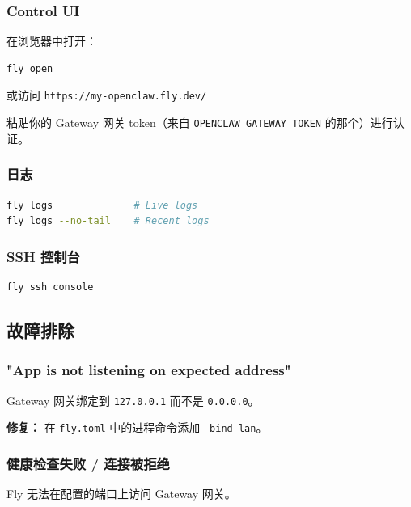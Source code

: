\subsubsection{Control UI}


在浏览器中打开：

\begin{lstlisting}[language=bash]
fly open
\end{lstlisting}


或访问 \texttt{https://my-openclaw.fly.dev/}

粘贴你的 Gateway 网关 token（来自 \texttt{OPENCLAW\_GATEWAY\_TOKEN} 的那个）进行认证。

\subsubsection{日志}


\begin{lstlisting}[language=bash]
fly logs              # Live logs
fly logs --no-tail    # Recent logs
\end{lstlisting}


\subsubsection{SSH 控制台}


\begin{lstlisting}[language=bash]
fly ssh console
\end{lstlisting}


\subsection{故障排除}


\subsubsection{"App is not listening on expected address"}


Gateway 网关绑定到 \texttt{127.0.0.1} 而不是 \texttt{0.0.0.0}。

\textbf{修复：} 在 \texttt{fly.toml} 中的进程命令添加 \texttt{--bind lan}。

\subsubsection{健康检查失败 / 连接被拒绝}


Fly 无法在配置的端口上访问 Gateway 网关。

